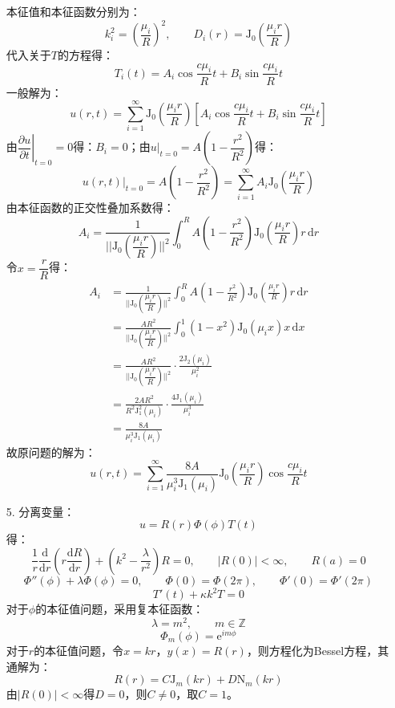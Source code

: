 \documentclass[fontset=windows]{ctexart}
\begin{document}
\begin{itemize}
    本征值和本征函数分别为：
    \[
    k_i^2 = \left(\frac{\mu_i}{R}\right)^2,\qquad D_i(r) = \mathrm{J}_0\left(\frac{\mu_i r}{R}\right)
    \]
    代入关于$T$的方程得：
    \[
    T_i(t) = A_i\cos\frac{c\mu_i}{R}t + B_i\sin\frac{c\mu_i}{R}t
    \]
    一般解为：
    \[
    u(r,t) = \sum_{i=1}^{\infty}\mathrm{J}_0\left(\frac{\mu_i r}{R}\right)\left[A_i\cos\frac{c\mu_i}{R}t + B_i\sin\frac{c\mu_i}{R}t\right]
    \]
    由$\left.\dfrac{\partial u}{\partial t}\right|_{t=0} = 0$得：$B_i = 0$；由$\left.u\right|_{t=0} = A\left(1 - \dfrac{r^2}{R^2}\right)$得：
    \[
    \left.u(r,t)\right|_{t=0} = A\left(1 - \frac{r^2}{R^2}\right) = \sum_{i=1}^{\infty}A_i\mathrm{J}_0\left(\frac{\mu_i r}{R}\right)
    \]
    由本征函数的正交性叠加系数得：
    \[
    A_i = \frac{1}{\Big|\Big|\mathrm{J}_0\left(\dfrac{\mu_i r}{R}\right)\Big|\Big|^2}\int_0^R A\left(1 - \frac{r^2}{R^2}\right)\mathrm{J}_0\left(\frac{\mu_i r}{R}\right)r \,\mathrm{d}r
    \]
    令$x = \dfrac{r}{R}$得：
    \begin{align*}
    A_i
    &= \frac{1}{\Big|\Big|\mathrm{J}_0\left(\dfrac{\mu_i r}{R}\right)\Big|\Big|^2}\int_0^R A\left(1 - \frac{r^2}{R^2}\right)\mathrm{J}_0\left(\frac{\mu_i r}{R}\right)r \,\mathrm{d}r \\
    &= \frac{AR^2}{\Big|\Big|\mathrm{J}_0\left(\dfrac{\mu_i r}{R}\right)\Big|\Big|^2}\int_0^1 \left(1-x^2\right)\mathrm{J}_0(\mu_i x)x \,\mathrm{d}x \\
    &= \frac{AR^2}{\Big|\Big|\mathrm{J}_0\left(\dfrac{\mu_i r}{R}\right)\Big|\Big|^2} \cdot \frac{2\mathrm{J}_2(\mu_i)}{\mu_i^2} \\
    &= \frac{2AR^2}{R^2 \mathrm{J}_1^2(\mu_i)} \cdot \frac{4\mathrm{J}_1(\mu_i)}{\mu_i^3} \\
    &= \frac{8A}{\mu_i^3 \mathrm{J}_1(\mu_i)}
    \end{align*}
    故原问题的解为：
    \[
    u(r,t) = \sum_{i=1}^{\infty}\frac{8A}{\mu_i^3 \mathrm{J}_1(\mu_i)}\mathrm{J}_0\left(\frac{\mu_i r}{R}\right)\cos\frac{c\mu_i}{R}t
    \]
    \bigskip

    \item[5.]
    分离变量：
    \[
    u = R(r)\varPhi(\phi)T(t)
    \]
    得：
    \[
    \frac{1}{r}\frac{\mathrm{d}}{\mathrm{d}r}\left(r\frac{\mathrm{d}R}{\mathrm{d}r}\right) + \left(k^2 - \frac{\lambda}{r^2}\right)R = 0,\qquad |R(0)| < \infty,\qquad R(a) = 0
    \]
    \[
    \varPhi''(\phi) + \lambda\varPhi(\phi) = 0,\qquad \varPhi(0) = \varPhi(2\pi),\qquad \varPhi'(0) = \varPhi'(2\pi)
    \]
    \[
    T'(t) + \kappa k^2T = 0
    \]
    对于$\phi$的本征值问题，采用复本征函数：
    \[
    \lambda = m^2,\qquad m \in \mathbb{Z}
    \]
    \[
    \varPhi_m(\phi) = \mathrm{e}^{im\phi}
    \]
    对于$r$的本征值问题，令$x = kr$，$y(x) = R(r)$，则方程化为Bessel方程，其通解为：
    \[
    R(r) = C\mathrm{J}_m(kr) + D\mathrm{N}_m(kr)
    \]
    由$|R(0)| < \infty$得$D = 0$，则$C \neq 0$，取$C = 1$。


\end{itemize}
\end{document}

